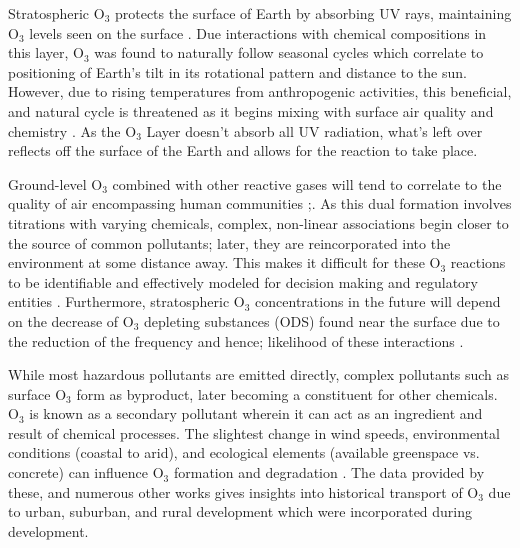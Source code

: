 Stratospheric O$_3$ protects the surface of Earth by absorbing UV rays, maintaining O$_3$ levels seen on the surface \parencite{dobson_measurements_1923,hodzic_response_2018}. Due interactions with chemical compositions in this layer, O$_3$ was found to naturally follow seasonal cycles which correlate to positioning of Earth’s tilt in its rotational pattern and distance to the sun. However, due to rising temperatures from anthropogenic activities, this beneficial, and natural cycle is threatened as it begins mixing with surface air quality and chemistry \parencite{akritidis_evaluating_2013,cristina_penache_temporal_2019,sadiq_effects_2016}. As the O$_3$ Layer doesn’t absorb all UV radiation, what’s left over reflects off the surface of the Earth and allows for the reaction to take place. 

Ground-level O$_3$ combined with other reactive gases will tend to correlate to the quality of air encompassing human communities \parencite{gaudel_tropospheric_2018};\cite{schultz_tropospheric_2017}. As this dual formation involves titrations with varying chemicals, complex, non-linear associations begin closer to the source of common pollutants; later, they are reincorporated into the environment at some distance away. This makes it difficult for these O$_3$ reactions to be identifiable and effectively modeled for decision making and regulatory entities \parencite{abdullah_development_2019,balamurugan_tropospheric_2021,huang_development_2017}. Furthermore, stratospheric O$_3$ concentrations in the future will depend on the decrease of O$_3$ depleting substances (ODS) found near the surface due to the reduction of the frequency and hence; likelihood of these interactions \parencite{huang_development_2017,mader_statistical_2007}. 

While most hazardous pollutants are emitted directly, complex pollutants such as surface O$_3$ form as byproduct, later becoming a constituent for other chemicals. O$_3$ is known as a secondary pollutant \parencite{lin_modeling_2012,watson_machine_2019,venkanna_environmental_2015} wherein it can act as an ingredient and result of chemical processes. The slightest change in wind speeds, environmental conditions (coastal to arid), and ecological elements (available greenspace vs. concrete) can influence O$_3$ formation and degradation \parencite{badia_modelling_2023,meng_influence_2022,xing_representing_2016}. The data provided by these, and numerous other works gives insights into historical transport of O$_3$ due to urban, suburban, and rural development which were incorporated during development.
